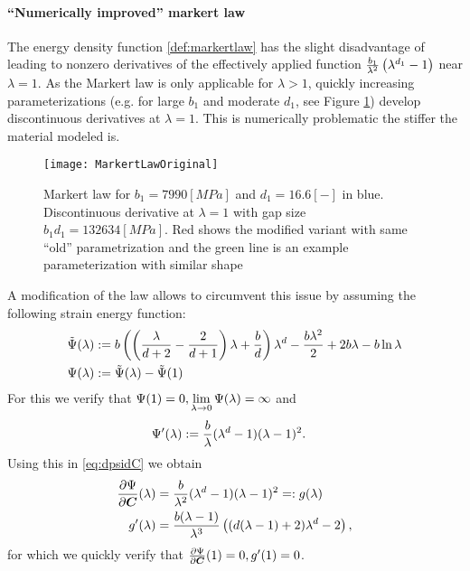 \paragraph{``Numerically improved'' markert law}
The energy density function \eqref{def:markertlaw} has the slight disadvantage
of leading to nonzero derivatives of the effectively applied function $\frac{b_1}{\lambda^2}\left(\lambda^{d_1} - 1\right)$ near $\lambda=1$.
As the Markert law is only applicable for $\lambda>1$, quickly increasing parameterizations (e.g. for large $b_1$ and moderate $d_1$, see Figure \ref{fig:steepmarkert})
develop discontinuous derivatives at $\lambda=1$. This is numerically problematic the stiffer the material modeled is.
\begin{figure}[!ht]
	\texttt{[image: MarkertLawOriginal]}
	\caption{Markert law for $b_1=7990 [MPa]$ and $d_1=16.6 [-]$ in blue. Discontinuous derivative at $\lambda=1$ with gap size $b_1d_1=132634 [MPa]$. Red shows the modified
	variant with same ``old'' parametrization and the green line is an example parameterization with similar shape}
	\label{fig:steepmarkert}
\end{figure}
A modification of the law allows to circumvent this issue by assuming the following strain energy function:
\begin{align}
	\tilde{\Psi}(\lambda) &:= b\left(\left(\frac{\lambda}{d+2}-\frac{2}{d+1}\right)\lambda+\frac{b}{d}\right)\lambda^d - \frac{b\lambda^2}{2} + 2b\lambda - b\ln\lambda\\
	\Psi(\lambda) &:= \tilde{\Psi}(\lambda) - \tilde{\Psi}(1)\label{def:markertlaw2}
\end{align}
For this we verify that $\Psi(1) = 0, \lim\limits_{\lambda\to0}\Psi(\lambda)=\infty$ and
\begin{align*}
	\Psi'(\lambda) &:= \frac{b}{\lambda}(\lambda^d-1)(\lambda-1)^2.
\end{align*}
Using this in \eqref{eq:dpsidC} we obtain
\begin{align*}
	\frac{\partial \Psi}{\partial \boldsymbol{C}}(\lambda) &= \frac{b}{\lambda^2}(\lambda^d-1)(\lambda-1)^2 =: g(\lambda)\\
	g'(\lambda) &= \frac{b(\lambda-1)}{\lambda^3}\left((d(\lambda-1)+2)\lambda^d - 2\right),
\end{align*}
for which we quickly verify that $\frac{\partial \Psi}{\partial \boldsymbol{C}}(1) = 0, g'(1) = 0$.

